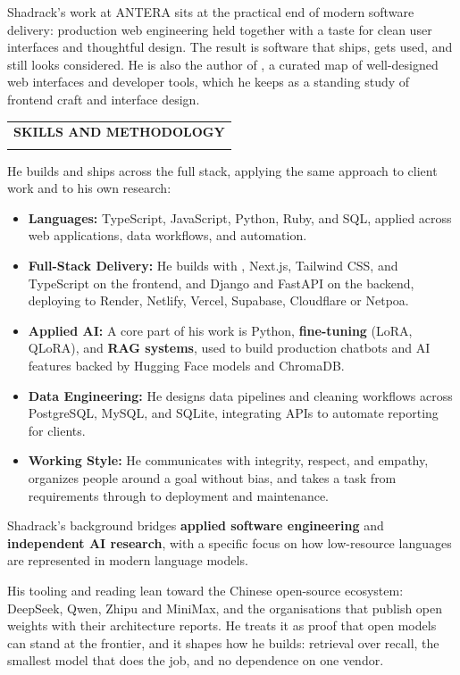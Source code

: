 \documentclass[12pt,a4paper]{article}
\makeatletter
\newcommand{\dottedsection}[1]{%
  \par\vspace{1.5em}%
  \noindent
  \begin{tabular}{@{}l@{}}
    {\large\textbf{\uppercase{#1}}} \\[-0.6em]
    \makebox[\widthof{\large\textbf{\uppercase{#1}}}]{\dotfill}
  \end{tabular}%
  \par\vspace{0.5em}%
}
\makeatother
\begin{document}
\vspace{0.5em}
\noindent Shadrack's work at ANTERA sits at the practical end of modern software delivery: production web engineering held together with a taste for clean user interfaces and thoughtful design. The result is software that ships, gets used, and still looks considered. He is also the author of , a curated map of well-designed web interfaces and developer tools, which he keeps as a standing study of frontend craft and interface design.

\vspace{1em}

\dottedsection{Skills and Methodology}
\noindent He builds and ships across the full stack, applying the same approach to client work and to his own research:
\begin{itemize}[leftmargin=1.5em, itemsep=0pt, parsep=0pt, topsep=2pt]
    \item \textbf{Languages:} TypeScript, JavaScript, Python, Ruby, and SQL, applied across web applications, data workflows, and automation.
    \item \textbf{Full-Stack Delivery:} He builds with , Next.js, Tailwind CSS, and TypeScript on the frontend, and Django and FastAPI on the backend, deploying to Render, Netlify, Vercel, Supabase, Cloudflare or Netpoa.
    \item \textbf{Applied AI:} A core part of his work is Python, \textbf{fine-tuning} (LoRA, QLoRA), and \textbf{RAG systems}, used to build production chatbots and AI features backed by Hugging Face models and ChromaDB.
    \item \textbf{Data Engineering:} He designs data pipelines and cleaning workflows across PostgreSQL, MySQL, and SQLite, integrating APIs to automate reporting for clients.
    \item \textbf{Working Style:} He communicates with integrity, respect, and empathy, organizes people around a goal without bias, and takes a task from requirements through to deployment and maintenance.
\end{itemize}

\vspace{0.5em}
\noindent Shadrack's background bridges \textbf{applied software engineering} and \textbf{independent AI research}, with a specific focus on how low-resource languages are represented in modern language models.

\vspace{0.5em}
\noindent His tooling and reading lean toward the Chinese open-source ecosystem: DeepSeek, Qwen, Zhipu and MiniMax, and the organisations that publish open weights with their architecture reports. He treats it as proof that open models can stand at the frontier, and it shapes how he builds: retrieval over recall, the smallest model that does the job, and no dependence on one vendor.
\end{document}
